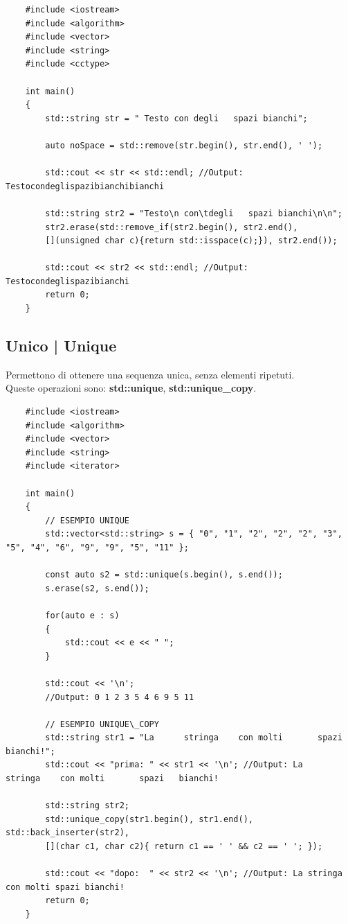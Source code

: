 \begin{lstlisting}
	#include <iostream>
	#include <algorithm>
	#include <vector>
	#include <string>
	#include <cctype>
	
	int main()
	{
		std::string str = " Testo con degli   spazi bianchi";
		
		auto noSpace = std::remove(str.begin(), str.end(), ' ');
		
		std::cout << str << std::endl; //Output: Testocondeglispazibianchibianchi
		
		std::string str2 = "Testo\n con\tdegli   spazi bianchi\n\n";
		str2.erase(std::remove_if(str2.begin(), str2.end(), 
		[](unsigned char c){return std::isspace(c);}), str2.end());
		
		std::cout << str2 << std::endl; //Output: Testocondeglispazibianchi
		return 0;
	}
\end{lstlisting}

\subsection{Unico | Unique}

\textsf{\small Permettono di ottenere una sequenza unica, senza elementi ripetuti.} \\

\textsf{\small Queste operazioni sono: \textbf{std::unique}, \textbf{std::unique\_copy}. } \\

\begin{lstlisting}
	#include <iostream>
	#include <algorithm>
	#include <vector>
	#include <string>
	#include <iterator>
	
	int main()
	{
		// ESEMPIO UNIQUE
		std::vector<std::string> s = { "0", "1", "2", "2", "2", "3", "5", "4", "6", "9", "9", "5", "11" };
		
		const auto s2 = std::unique(s.begin(), s.end());
		s.erase(s2, s.end());
		
		for(auto e : s)
		{
			std::cout << e << " ";
		}
		
		std::cout << '\n';
		//Output: 0 1 2 3 5 4 6 9 5 11
		
		// ESEMPIO UNIQUE\_COPY
		std::string str1 = "La      stringa    con molti       spazi   bianchi!";
		std::cout << "prima: " << str1 << '\n'; //Output: La      stringa    con molti       spazi   bianchi!
		
		std::string str2;
		std::unique_copy(str1.begin(), str1.end(), std::back_inserter(str2),
		[](char c1, char c2){ return c1 == ' ' && c2 == ' '; });
		
		std::cout << "dopo:  " << str2 << '\n'; //Output: La stringa con molti spazi bianchi!
		return 0;
	}
\end{lstlisting}

